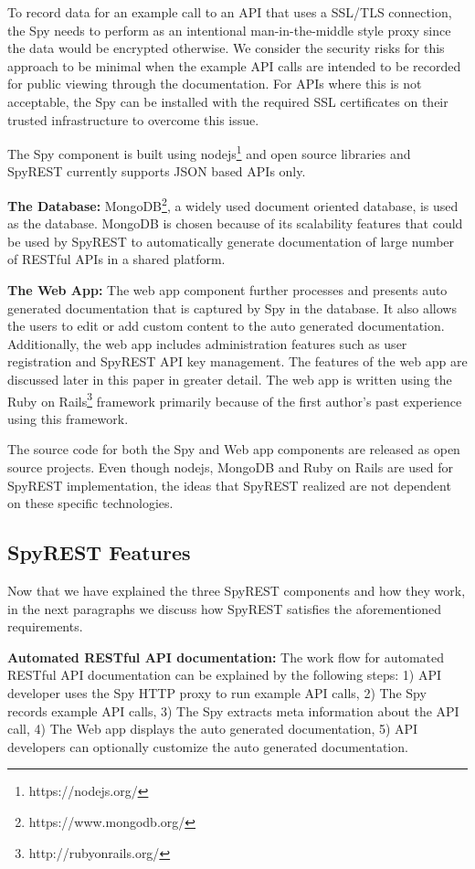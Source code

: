\documentclass[conference]{IEEEtran}
\begin{document}
To record data for an example call to an API that uses a SSL/TLS connection, the Spy needs to perform as an intentional man-in-the-middle style proxy since the data would be encrypted otherwise. We consider the security risks for this approach to be minimal when the example API calls are intended to be recorded for public viewing through the documentation. For APIs where this is not acceptable, the Spy can be installed with the required SSL certificates on their trusted infrastructure to overcome this issue.

The Spy component is built using nodejs\footnote{https://nodejs.org/} and open source libraries and SpyREST currently supports JSON based APIs only.

\textbf{The Database:} MongoDB\footnote{https://www.mongodb.org/}, a widely used document oriented database, is used as the database. MongoDB is  chosen because of its scalability features that could be used by SpyREST to automatically generate documentation of large number of RESTful APIs in a shared platform.

\textbf{The Web App:} The web app component further processes and presents auto generated documentation that is captured by Spy in the database. It also allows the users to edit or add custom content to the auto generated documentation. Additionally, the web app includes administration features such as user registration and SpyREST API key management. The features of the web app are discussed later in this paper in greater detail. The web app is written using the Ruby on Rails\footnote{http://rubyonrails.org/} framework primarily because of the first author's past experience using this framework.

The source code for both the Spy and Web app components are released as open source projects. Even though nodejs, MongoDB and Ruby on Rails are used for SpyREST implementation, the ideas that SpyREST realized are not dependent on these specific technologies.

\subsection{SpyREST Features} %

Now that we have explained the three SpyREST components and how they work, in the next paragraphs we discuss how SpyREST satisfies the aforementioned requirements.

\textbf{Automated RESTful API documentation:} The work flow for automated RESTful API documentation can be explained by the following steps: 1) API developer uses the Spy HTTP proxy to run example API calls, 2) The Spy records example API calls, 3) The Spy extracts meta information about the API call, 4) The Web app displays the auto generated documentation, 5) API developers can optionally customize the auto generated documentation.
\end{document}
